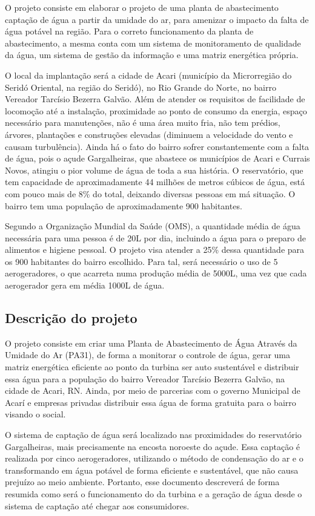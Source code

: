   O projeto consiste em elaborar o projeto de uma planta de abastecimento captação de água a partir da umidade do ar, para amenizar
  o impacto da falta de água potável na região. Para o correto funcionamento da planta de abastecimento, a mesma conta com um sistema
  de monitoramento de qualidade da água, um sistema de gestão da informação e uma matriz energética própria.

  O local da implantação será a cidade de Acari (município da Microrregião do Seridó Oriental, na região do Seridó), no Rio Grande 
  do Norte, no bairro Vereador Tarcísio Bezerra Galvão. Além de atender os requisitos de facilidade de locomoção até a instalação,
  proximidade ao ponto de consumo da energia, espaço necessário para manutenções, não é uma área muito fria, não tem prédios, árvores,
  plantações e construções elevadas (diminuem a velocidade do vento e causam turbulência). Ainda há o fato do bairro sofrer 
  constantemente com a falta de água, pois o açude Gargalheiras, que abastece os municípios de Acari e Currais Novos, atingiu o 
  pior volume de água de toda a sua história. O reservatório, que tem capacidade de aproximadamente 44 milhões de metros cúbicos
  de água, está com pouco mais de 8\% do total, deixando diversas pessoas em má situação. O bairro tem uma população de 
  aproximadamente 900 habitantes.

  Segundo a Organização Mundial da Saúde (OMS), a quantidade média de água necessária para uma pessoa é de 20L por dia, incluindo
  a água para o preparo de alimentos e higiene pessoal. O projeto visa atender a 25\% dessa quantidade para os 900 habitantes
  do bairro escolhido. Para tal, será necessário o uso de 5 aerogeradores, o que acarreta numa produção média de 5000L, uma vez
  que cada aerogerador gera em média 1000L de água.
  
\subsection{Descrição do projeto}
O projeto consiste em criar uma Planta de Abastecimento de Água Através da Umidade do Ar (PA31), de forma a monitorar o controle de água, gerar uma matriz energética eficiente ao ponto da turbina ser auto sustentável e distribuir essa água para a população do bairro Vereador Tarcísio Bezerra Galvão, na cidade de Acari, RN. Ainda, por meio de parcerias com o governo Municipal de Acarí e empresas privadas distribuir essa água de forma gratuita para o bairro visando o social. 

	O sistema de captação de água será localizado nas proximidades do reservatório Gargalheiras, mais precisamente na encosta noroeste do açude. Essa captação é realizada por cinco aerogeradores, utilizando o método de condensação do ar e o transformando em água potável de forma eficiente e sustentável, que não causa prejuízo ao meio ambiente. Portanto, esse documento descreverá de forma resumida como será o funcionamento do da turbina e a geração de água desde o sistema de captação até chegar aos consumidores.
